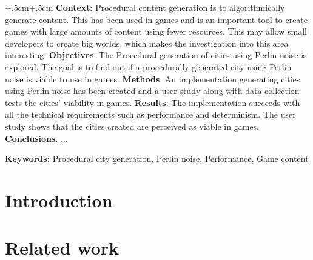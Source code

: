 \documentclass[a4paper,oneside]{bth}
\begin{document}
\abstract
\begin{changemargin}{+.5cm}{+.5cm}
\noindent
\textbf{Context}: Procedural content generation is to algorithmically generate content. This has been used in games and is an important tool to create games with large amounts of content using fewer resources. This may allow small developers to create big worlds, which makes the investigation into this area interesting.\newline
\textbf{Objectives}: The Procedural generation of cities using Perlin noise is explored. The goal is to find out if a procedurally generated city using Perlin noise is viable to use in games. \newline
\textbf{Methods}: An implementation generating cities using Perlin noise has been created and a user study along with data collection tests the cities' viability in games.\newline
\textbf{Results}: The implementation succeeds with all the technical requirements such as performance and determinism. The user study shows that the cities created are perceived as viable in games. \newline
\textbf{Conclusions}. ...

\vspace {1cm}
\noindent
\textbf{Keywords:} Procedural city generation, Perlin noise, Performance, Game content

\end{changemargin}


\tableofcontents

\cleardoublepage
\pagestyle{headings}


\chapter{Introduction}


\chapter{Related work}

\end{document}
